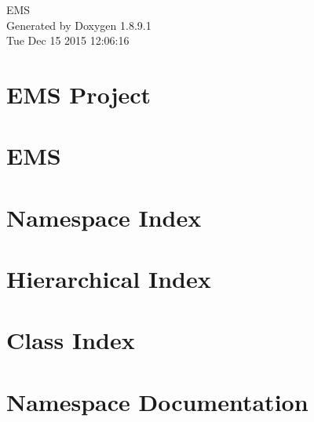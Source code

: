\documentclass[twoside]{book}
\newcommand{\+}{\discretionary{\mbox{\scriptsize$\hookleftarrow$}}{}{}}
\newcommand{\clearemptydoublepage}{%
  \newpage{\pagestyle{empty}\cleardoublepage}%
}
\begin{document}
\hypersetup{pageanchor=false,
             bookmarks=true,
             bookmarksnumbered=true,
             pdfencoding=unicode
            }
\begin{titlepage}
\vspace*{7cm}
\begin{center}%
{\Large E\+M\+S }\\
\vspace*{1cm}
{\large Generated by Doxygen 1.8.9.1}\\
\vspace*{0.5cm}
{\small Tue Dec 15 2015 12:06:16}\\
\end{center}
\end{titlepage}
\clearemptydoublepage
\tableofcontents
\clearemptydoublepage
{}
\hypersetup{pageanchor=true}

\chapter{E\+M\+S Project}
\label{index}\hypertarget{index}{}
\chapter{E\+M\+S}
\label{md__c_1__s_e_t_repo_trunk__e_m_s_trunk__r_e_a_d_m_e}
\hypertarget{md__c_1__s_e_t_repo_trunk__e_m_s_trunk__r_e_a_d_m_e}{}

\chapter{Namespace Index}

\chapter{Hierarchical Index}

\chapter{Class Index}

\chapter{Namespace Documentation}










\end{document}
